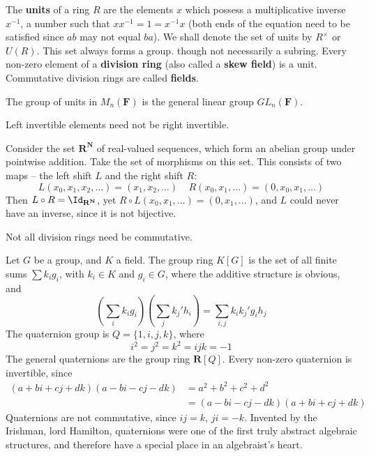 \begin{definition}
    The {\bf units} of a ring $R$ are the elements $x$ which possess a multiplicative inverse $x^{-1}$, a number such that $xx^{-1} = 1 = x^{-1}x$ (both ends of the equation need to be satisfied since $ab$ may not equal $ba$). We shall denote the set of units by $R^\times$ or $U(R)$. This set always forms a group. though not necessarily a subring. Every non-zero element of a {\bf division ring} (also called a {\bf skew field}) is a unit. Commutative division rings are called {\bf fields}.
\end{definition}

\begin{example}
    The group of units in $M_n(\mathbf{F})$ is the general linear group $GL_n(\mathbf{F})$.
\end{example}

Left invertible elements need not be right invertible.

\begin{example}
    Consider the set $\mathbf{R}^\mathbf{N}$ of real-valued sequences, which form an abelian group under pointwise addition. Take the set of morphisms on this set. This consists of two maps -- the left shift $L$ and the right shift $R$:
    \[ L(x_0, x_1, x_2, \dots) = (x_1, x_2, \dots)\ \ \ \ \ R(x_0, x_1, \dots) = (0, x_0, x_1, \dots) \]
    Then $L \circ R = \Id_{\mathbf{R}^\mathbf{N}}$, yet $R \circ L(x_0, x_1, \dots) = (0, x_1, \dots)$, and $L$ could never have an inverse, since it is not bijective.
\end{example}

Not all division rings need be commutative.

\begin{example}
    Let $G$ be a group, and $K$ a field. The group ring $K[G]$ is the set of all finite sums $\sum k_i g_i$, with $k_i \in K$ and $g_i \in G$, where the additive structure is obvious, and
    \[ \left( \sum_i k_i g_i \right) \left( \sum_j k_j' h_i \right) = \sum_{i,j} k_i k_j' g_i h_j \]
    The quaternion group is $Q = \{ 1, i, j, k \}$, where
    \[ i^2 = j^2 = k^2 = ijk = -1 \]
    The general quaternions are the group ring $\mathbf{R}[Q]$. Every non-zero quaternion is invertible, since
    \begin{align*}
        (a + bi + cj + dk)(a - bi - cj - dk) &= a^2 + b^2 + c^2 + d^2\\
        &= (a - bi - cj - dk)(a + bi + cj + dk)
    \end{align*}
    Quaternions are not commutative, since $ij = k$, $ji = -k$. Invented by the Irishman, lord Hamilton, quaternions were one of the first truly abstract algebraic structures, and therefore have a special place in an algebraist's heart.
\end{example}

